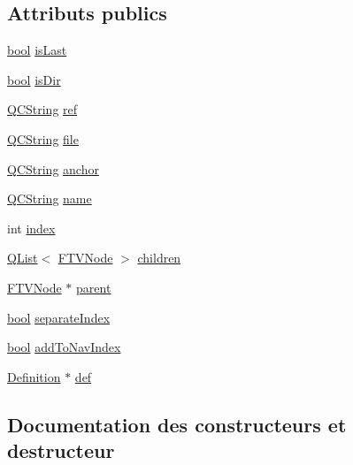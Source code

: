 \subsection*{Attributs publics}
\begin{DoxyCompactItemize}
\item 
\hyperlink{qglobal_8h_a1062901a7428fdd9c7f180f5e01ea056}{bool} \hyperlink{struct_f_t_v_node_a372062c2fc8595d96798765ae195556d}{is\+Last}
\item 
\hyperlink{qglobal_8h_a1062901a7428fdd9c7f180f5e01ea056}{bool} \hyperlink{struct_f_t_v_node_aa9ffc5909967a0bfe9170e45f6117c64}{is\+Dir}
\item 
\hyperlink{class_q_c_string}{Q\+C\+String} \hyperlink{struct_f_t_v_node_a71d6d3927c045809ce5fcb6cf15da3d9}{ref}
\item 
\hyperlink{class_q_c_string}{Q\+C\+String} \hyperlink{struct_f_t_v_node_a9e70cf96146fd5fda79891bdbd45082a}{file}
\item 
\hyperlink{class_q_c_string}{Q\+C\+String} \hyperlink{struct_f_t_v_node_a9a78c56961b2ea3b97249a149bced5ad}{anchor}
\item 
\hyperlink{class_q_c_string}{Q\+C\+String} \hyperlink{struct_f_t_v_node_aa805d89320be25581ff3dcfed7f0c903}{name}
\item 
int \hyperlink{struct_f_t_v_node_abc09d6f0f31ec0b09b775da0814ef904}{index}
\item 
\hyperlink{class_q_list}{Q\+List}$<$ \hyperlink{struct_f_t_v_node}{F\+T\+V\+Node} $>$ \hyperlink{struct_f_t_v_node_a5e924e9ea4e2d29721bc391b83d5b73a}{children}
\item 
\hyperlink{struct_f_t_v_node}{F\+T\+V\+Node} $\ast$ \hyperlink{struct_f_t_v_node_a65ba33768f767c0d634cc94a251f4f9c}{parent}
\item 
\hyperlink{qglobal_8h_a1062901a7428fdd9c7f180f5e01ea056}{bool} \hyperlink{struct_f_t_v_node_a1f979a212a1251b75ec4a06c1ddeafb4}{separate\+Index}
\item 
\hyperlink{qglobal_8h_a1062901a7428fdd9c7f180f5e01ea056}{bool} \hyperlink{struct_f_t_v_node_a53c74b2ed0c6f5e54541fcaf086008ed}{add\+To\+Nav\+Index}
\item 
\hyperlink{class_definition}{Definition} $\ast$ \hyperlink{struct_f_t_v_node_af7ef22a268ee00d12a6989c89a66823e}{def}
\end{DoxyCompactItemize}


\subsection{Documentation des constructeurs et destructeur}
\hypertarget{struct_f_t_v_node_a8dc5d27f90a72e693407fed361e0370e}{}
